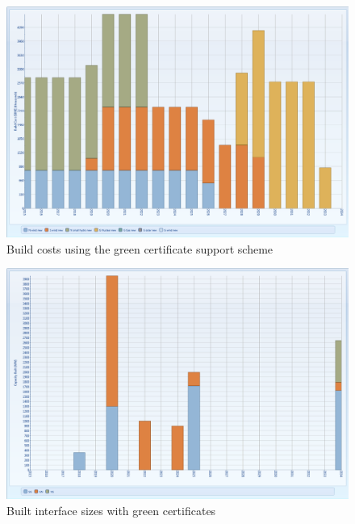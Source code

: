 \documentclass{article}
\begin{document}
\begin{figure}[htbp]
\begin{center}
\includegraphics[width=13cm,keepaspectratio=true]{figures/Expansion/GreenCertificate/BuildCostGC}
\caption{Build costs using the green certificate support scheme}
\label{fig:BuildCostGC}
\end{center}
\end{figure}
\begin{figure}[htbp]
\begin{center}
\includegraphics[width=13cm,keepaspectratio=true]{figures/Expansion/GreenCertificate/CapacityBuiltInterfaceGC}
\caption{Built interface sizes with green certificates}
\label{fig:CapacityBuiltInterfaceGC}
\end{center}
\end{figure}
\end{document}
